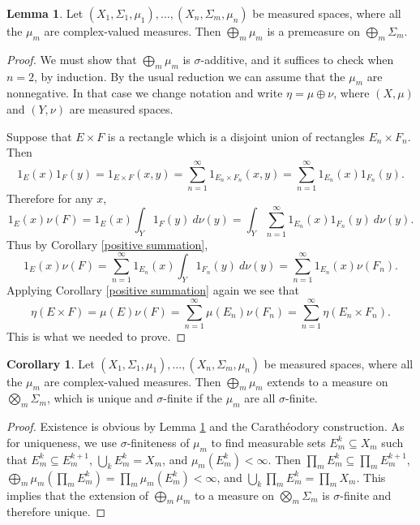 \documentclass[12pt]{book}
\theoremstyle{definition}
\newtheorem{lemma}[theorem]{Lemma}
\newtheorem{corollary}[theorem]{Corollary}
\begin{document}
\begin{lemma}
\label{product premeasure is a premeasure}
Let $(X_1, \Sigma_1, \mu_1), \dots, (X_n, \Sigma_m, \mu_n)$ be measured spaces, where all the $\mu_m$ are complex-valued measures.
Then $\bigoplus_m \mu_m$ is a premeasure on $\bigoplus_m \Sigma_m$.
\end{lemma}
\begin{proof}
We must show that $\bigoplus_m \mu_m$ is $\sigma$-additive, and it suffices to check when $n = 2$, by induction.
By the usual reduction we can assume that the $\mu_m$ are nonnegative.
In that case we change notation and write $\eta = \mu \oplus \nu$, where $(X, \mu)$ and $(Y, \nu)$ are measured spaces.

Suppose that $E \times F$ is a rectangle which is a disjoint union of rectangles $E_n \times F_n$.
Then
$$1_E(x) 1_F(y) = 1_{E \times F}(x, y) = \sum_{n=1}^\infty 1_{E_n \times F_n}(x, y) = \sum_{n=1}^\infty 1_{E_n}(x) 1_{F_n}(y).$$
Therefore for any $x$,
$$1_E(x) \nu(F) = 1_E(x) \int_Y 1_F(y)~d\nu(y) = \int_Y \sum_{n=1}^\infty 1_{E_n}(x) 1_{F_n}(y) ~d\nu(y).$$
Thus by Corollary \ref{positive summation},
$$1_E(x) \nu(F) = \sum_{n=1}^\infty 1_{E_n}(x) \int_Y 1_{F_n}(y)~d\nu(y) = \sum_{n=1}^\infty 1_{E_n}(x)\nu(F_n).$$
Applying Corollary \ref{positive summation} again we see that
$$\eta(E \times F) = \mu(E) \nu(F) = \sum_{n=1}^\infty \mu(E_n) \nu(F_n) = \sum_{n=1}^\infty \eta(E_n \times F_n).$$
This is what we needed to prove.
\end{proof}

\begin{corollary}
Let $(X_1, \Sigma_1, \mu_1), \dots, (X_n, \Sigma_m, \mu_n)$ be measured spaces, where all the $\mu_m$ are complex-valued measures.
Then $\bigoplus_m \mu_m$ extends to a measure on $\bigotimes_m \Sigma_m$, which is unique and $\sigma$-finite if the $\mu_m$ are all $\sigma$-finite.
\end{corollary}
\begin{proof}
Existence is obvious by Lemma \ref{product premeasure is a premeasure} and the Carathéodory construction.
As for uniqueness, we use $\sigma$-finiteness of $\mu_m$ to find measurable sets $E_m^k \subseteq X_m$ such that $E_m^k \subseteq E_m^{k+1}$, $\bigcup_k E_m^k = X_m$, and $\mu_m(E_m^k) < \infty$.
Then $\prod_m E_m^k \subseteq \prod_m E_m^{k+1}$, $\bigoplus_m \mu_m(\prod_m E_m^k) = \prod_m \mu_m(E_m^k) < \infty$, and $\bigcup_k \prod_m E_m^k = \prod_m X_m$.
This implies that the extension of $\bigoplus_m \mu_m$ to a measure on $\bigotimes_m \Sigma_m$ is $\sigma$-finite and therefore unique.
\end{proof}
\end{document}
